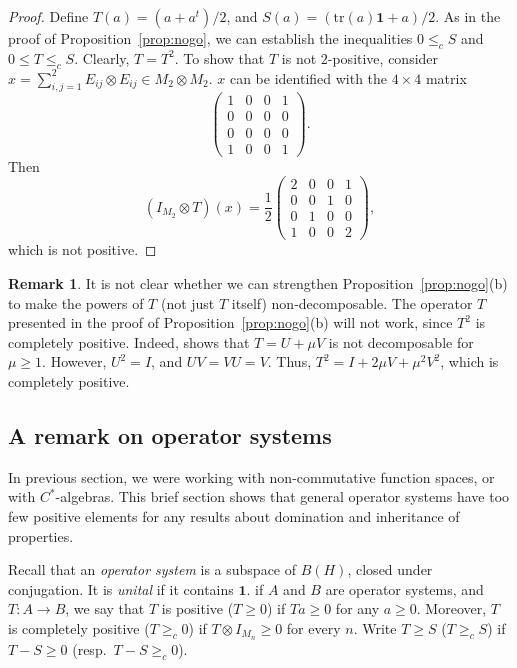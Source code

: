 \documentclass[12pt]{amsart}
\theoremstyle{plain}
\theoremstyle{definition}
\newtheorem{remark}[theorem]{Remark}
\renewcommand{\leq}{\leqslant}
\renewcommand{\geq}{\geqslant}\usepackage{amssymb}
\newcommand{\one}{\mathbf{1}}
\newcommand{\trace}{\mathrm{tr}}
\begin{document}
\begin{proof}
Define $T(a) = (a+a^t)/2$, and $S(a) = (\trace(a) \one + a)/2$.
As in the proof of Proposition~\ref{prop:nogo}, we can establish
the inequalities $0 \leq_c S$ and $0 \leq T \leq_c S$.
Clearly, $T  = T^2$. To show that $T$ is not $2$-positive, consider
$x = \sum_{i,j=1}^2 E_{ij} \otimes E_{ij} \in M_2 \otimes M_2$. $x$ can be
identified with the $4 \times 4$ matrix
$$
\begin{pmatrix}
   1 & 0 & 0 & 1  \\
   0 & 0 & 0 & 0  \\
   0 & 0 & 0 & 0  \\
   1 & 0 & 0 & 1
\end{pmatrix} .
$$
Then
$$
(I_{M_2} \otimes T)(x) = \frac{1}{2} \begin{pmatrix}
   2 & 0 & 0 & 1  \\
   0 & 0 & 1 & 0  \\
   0 & 1 & 0 & 0  \\
   1 & 0 & 0 & 2
\end{pmatrix} ,
$$
which is not positive.
\end{proof}

\begin{remark}\label{rem:powers}
It is not clear whether we can strengthen Proposition~\ref{prop:nogo}(b) to make
the powers of $T$ (not just $T$ itself) non-decomposable. The operator $T$ presented
in the proof of Proposition~\ref{prop:nogo}(b) will not work, since $T^2$ is completely
positive. Indeed, \cite{St82} shows that $T = U + \mu V$ is not decomposable for
$\mu \geq 1$. However, $U^2 = I$, and $UV = VU = V$.
Thus, $T^2 = I + 2 \mu V + \mu^2 V^2$, which is completely positive.
\end{remark}

\subsection{A remark on operator systems}\label{ss:op_sys}
In previous section, we were working with non-commutative function spaces,
or with $C^*$-algebras. This brief section shows that general operator
systems have too few positive elements for any results about domination
and inheritance of properties.

Recall that an \emph{operator system} is a subspace of $B(H)$,
closed under conjugation. It is \emph{unital} if it contains $\one$.
if $A$ and $B$ are operator systems, and $T : A \to B$, we say that
$T$ is positive ($T \geq 0$) if $Ta \geq 0$ for any $a \geq 0$. Moreover,
$T$ is completely positive ($T \geq_c 0$) if $T \otimes I_{M_n} \geq 0$
for every $n$. Write $T \geq S$ ($T \geq_c S$) if $T - S \geq 0$
(resp.~$T - S \geq_c 0$).
\end{document}
